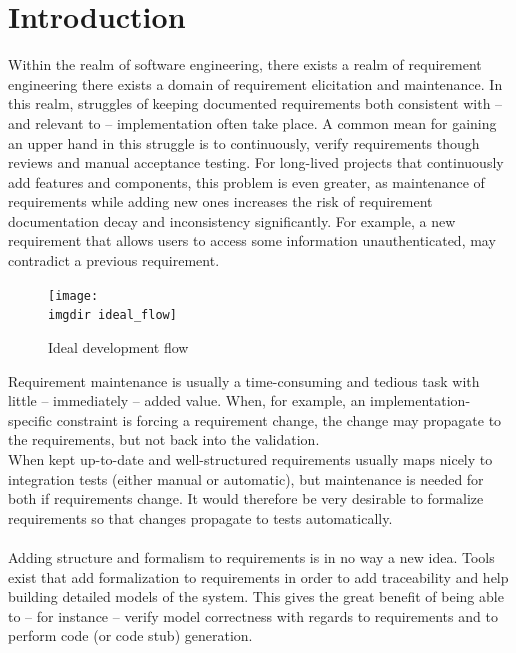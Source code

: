 \chapter{Introduction}


Within the realm of software engineering, there exists a realm of requirement engineering there exists a domain of requirement elicitation and maintenance. In this realm, struggles of keeping documented requirements both consistent with -- and relevant to -- implementation often take place. A common mean for gaining an upper hand in this struggle is to continuously, verify requirements though reviews and manual acceptance testing.
For long-lived projects that continuously add features and components, this problem is even greater, as maintenance of requirements while adding new ones increases the risk of requirement documentation decay and inconsistency significantly. For example, a new requirement that allows users to access some information unauthenticated, may contradict a previous requirement.
\begin{figure}[!htbp]
\centering
\texttt{[image: \\imgdir ideal\_flow]}
\caption{Ideal development flow}
\label{fig:ideal_flow}
\end{figure}Requirement maintenance is usually a time-consuming and tedious task with little -- immediately -- added value. When, for example, an implementation-specific constraint is forcing a requirement change, the change may propagate to the requirements, but not back into the validation.\\
When kept up-to-date and well-structured requirements usually maps nicely to integration tests (either manual or automatic), but maintenance is needed for both if requirements change. It would therefore be very desirable to formalize requirements so that changes propagate to tests automatically.\\\\
Adding structure and formalism to requirements is in no way a new idea. Tools exist that add formalization to requirements in order to add traceability and help building detailed models of the system. This gives the great benefit of being able to -- for instance -- verify model correctness with regards to requirements and to perform code (or code stub) generation.\\
